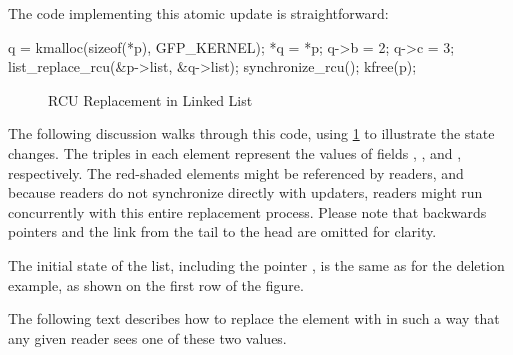 The code implementing this atomic update is straightforward:

\begin{fcvlabel}
\begin{VerbatimN}[samepage=true,commandchars=\\\[\],firstnumber=15]
q = kmalloc(sizeof(*p), GFP_KERNEL);	\lnlbl[kmalloc]
*q = *p;				\lnlbl[copy]
q->b = 2;				\lnlbl[update1]
q->c = 3;				\lnlbl[update2]
list_replace_rcu(&p->list, &q->list);	\lnlbl[replace]
synchronize_rcu();			
kfree(p);				\lnlbl[kfree]
\end{VerbatimN}
\end{fcvlabel}

\begin{figure}
\centering
{}
\caption{RCU Replacement in Linked List}
\label{fig:defer:RCU Replacement in Linked List}
\end{figure}

The following discussion walks through this code, using
\cref{fig:defer:RCU Replacement in Linked List} to illustrate
the state changes.
The triples in each element represent the values of fields ,
, and , respectively.
The red-shaded elements might be referenced by readers,
and because readers do not synchronize directly with updaters,
readers might run concurrently with this entire replacement process.
Please note that backwards pointers and the link from the tail to the
head are omitted for clarity.

The initial state of the list, including the pointer ,
is the same as for the deletion example, as shown on the
first row of the figure.

The following text describes how to replace the  element
with  in such a way that any given reader sees one of these
two values.

